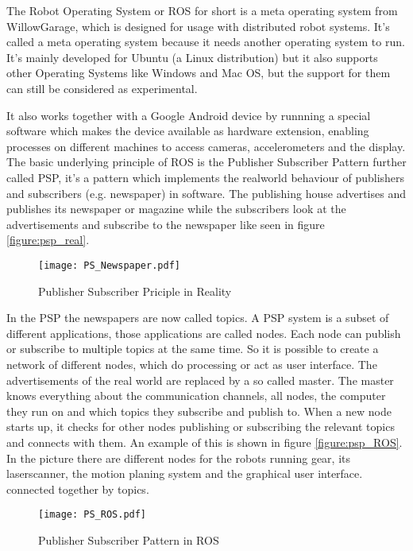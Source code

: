 The Robot Operating System or ROS for short is a meta operating system from WillowGarage, which is designed for usage with distributed 
robot systems. It's called a meta operating system because it needs another operating system to run. It's mainly developed for Ubuntu 
(a Linux distribution) but it also supports other Operating Systems like Windows and Mac OS, but the support for them can still be considered 
as experimental. 

It also works together with a Google Android device by runnning a special software which makes the device available
as hardware extension, enabling processes on different machines to access cameras, accelerometers and the display.
The basic underlying principle of ROS is the Publisher Subscriber Pattern further called PSP, it's a pattern which 
implements the realworld behaviour of publishers and subscribers (e.g. newspaper) in software. 
The publishing house advertises and publishes its newspaper or magazine while the subscribers look at the advertisements
and subscribe to the newspaper like seen in figure \vref{figure:psp_real}.

\begin{figure}[htp]
	\centering
	\texttt{[image: PS\_Newspaper.pdf]}
	\caption{Publisher Subscriber Priciple in Reality}
	\label{figure:psp_real}
\end{figure} 


In the PSP the newspapers are now called topics. A PSP system is a subset of different applications, those applications are called nodes.  
Each node can publish or subscribe to multiple topics at the same time. So it is possible to create a network of different nodes, which
do processing or act as user interface. The advertisements of the real world are replaced by a so called master. 
The master knows everything about the communication channels, all nodes, the computer they run on and 
which topics they subscribe and publish to. When a new node starts up, it checks for other nodes publishing or subscribing the relevant topics
and connects with them. An example of this is shown in figure \vref{figure:psp_ROS}.
In the picture there are different nodes for the robots running gear, its laserscanner, the motion planing system and the graphical user interface.
connected together by topics.

\begin{figure}[htp]
	\centering
	\texttt{[image: PS\_ROS.pdf]}
	\caption{Publisher Subscriber Pattern in ROS}
	\label{figure:psp_ROS}
\end{figure} 


